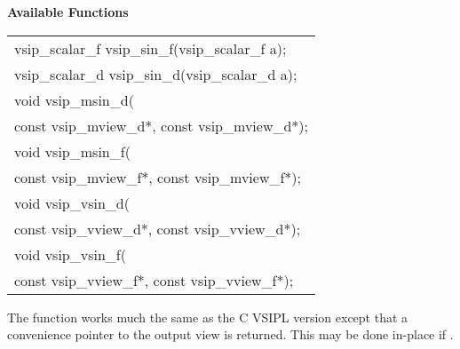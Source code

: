 \cvsiplh
\newline \hspace*{.8cm} \vspace*{.1cm} \textbf{Available Functions }
\newline \hspace*{1.1cm} {
\ttfamily
\begin{tabular}[H]{l}
vsip\_scalar\_f vsip\_sin\_f(vsip\_scalar\_f a);\\
vsip\_scalar\_d vsip\_sin\_d(vsip\_scalar\_d a);\\
void vsip\_msin\_d(\\*
\hspace{1cm}const vsip\_mview\_d*, const vsip\_mview\_d*);\\
void vsip\_msin\_f(\\*
\hspace{1cm}const vsip\_mview\_f*, const vsip\_mview\_f*);\\
void vsip\_vsin\_d(\\*
\hspace{1cm}const vsip\_vview\_d*, const vsip\_vview\_d*);\\
void vsip\_vsin\_f(\\*
\hspace{1cm}const vsip\_vview\_f*, const vsip\_vview\_f*);\\
\end{tabular}
}
\pyjvsiph
{}
\newline\hspace*{1.2cm}\parbox{10.8cm}{\vspace*{.1cm}The  function works much the same as the C VSIPL version except that a convenience pointer to the output view is returned. This may be done in-place if .}

